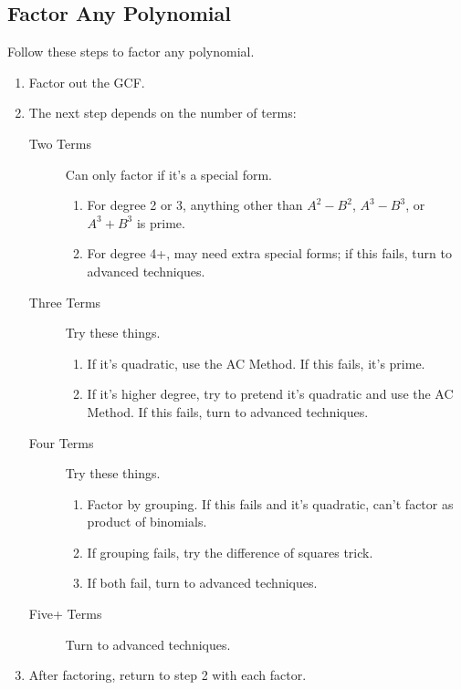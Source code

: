 \subsection{Factor Any Polynomial} 
Follow these steps to factor any polynomial.
\begin{enumerate}
\item Factor out the GCF.
\item The next step depends on the number of terms:
\begin{description}
\item [Two Terms] Can only factor if it's a special form.
\begin{enumerate}
\item For degree 2 or 3, anything other than $A^2-B^2$, $A^3-B^3$, or $A^3+B^3$ is prime.
\item For degree 4+, may need extra special forms; if this fails, turn to advanced techniques.
\end{enumerate}
\item [Three Terms] Try these things.
\begin{enumerate}
\item If it's quadratic, use the AC Method. If this fails, it's prime.
\item If it's higher degree, try to pretend it's quadratic and use the AC Method. If this fails, turn to advanced techniques.
\end{enumerate}
\item [Four Terms] Try these things.
\begin{enumerate}
\item Factor by grouping. If this fails and it's quadratic, can't factor as product of binomials.
\item If grouping fails, try the difference of squares trick.
\item If both fail, turn to advanced techniques.
\end{enumerate}
\item [Five+ Terms] Turn to advanced techniques.
\end{description}
\item After factoring, return to step 2 with each factor.
\end{enumerate}